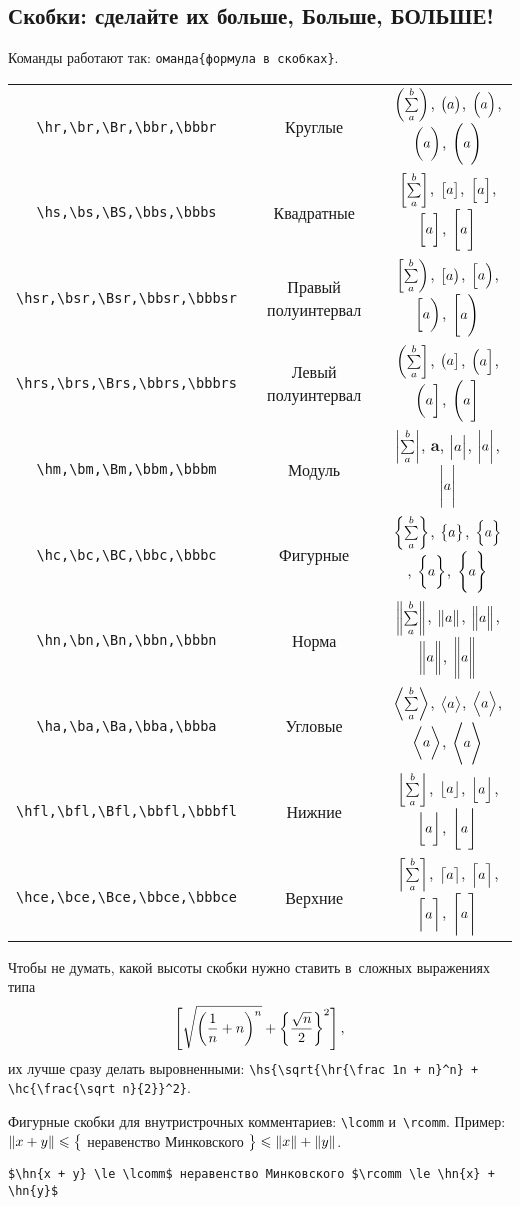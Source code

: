 \documentclass[a4paper]{article}
\begin{document}
\subsection{Скобки: сделайте их больше, Больше, БОЛЬШЕ!}
Команды работают так: \verb"оманда{формула в скобках}".
\begin{center}
\begin{tabular}{ccc}
\verb"\hr,\br,\Br,\bbr,\bbbr" & Круглые & $\left(\sum\limits_{{a}}^{{b}}\right)$, $\bigl(a\bigr)$, $\Bigl(a\Bigr)$, $\biggl(a\biggr)$, $\Biggl(a\Biggr)$ \\
\verb"\hs,\bs,\BS,\bbs,\bbbs" & Квадратные & $\left[\sum\limits_{{a}}^{{b}}\right]$, $\bigl[a\bigr]$, $\Bigl[a\Bigr]$, $\biggl[a\biggr]$, $\Biggl[a\Biggr]$ \\
\verb"\hsr,\bsr,\Bsr,\bbsr,\bbbsr" & Правый полуинтервал & $\left[\sum\limits_{{a}}^{{b}}\right)$, $\bigl[a\bigr)$, $\Bigl[a\Bigr)$, $\biggl[a\biggr)$, $\Biggl[a\Biggr)$ \\
\verb"\hrs,\brs,\Brs,\bbrs,\bbbrs" & Левый полуинтервал & $\left(\sum\limits_{{a}}^{{b}}\right]$, $\bigl(a\bigr]$, $\Bigl(a\Bigr]$, $\biggl(a\biggr]$, $\Biggl(a\Biggr]$ \\
\verb"\hm,\bm,\Bm,\bbm,\bbbm" & Модуль & $\left|\sum\limits_{{a}}^{{b}}\right|$, $\bm{a}$, $\Bigl|a\Bigr|$, $\biggl|a\biggr|$, $\Biggl|a\Biggr|$ \\
\verb"\hc,\bc,\BC,\bbc,\bbbc" & Фигурные & $\left\{\sum\limits_{{a}}^{{b}}\right\}$, $\bigl\{a\bigr\}$, $\Bigl\{a\Bigr\}$, $\biggl\{a\biggr\}$, $\Biggl\{a\Biggr\}$ \\
\verb"\hn,\bn,\Bn,\bbn,\bbbn" & Норма & $\left\|\sum\limits_{{a}}^{{b}}\right\|$, $\bigl\|a\bigr\|$, $\Bigl\|a\Bigr\|$, $\biggl\|a\biggr\|$, $\Biggl\|a\Biggr\|$ \\
\verb"\ha,\ba,\Ba,\bba,\bbba" & Угловые & $\left\langle\sum\limits_{{a}}^{{b}}\right\rangle$, $\bigl\langle a\bigr\rangle$, $\Bigl\langle a\Bigr\rangle$, $\biggl\langle a\biggr\rangle$, $\Biggl\langle a\Biggr\rangle$ \\
\verb"\hfl,\bfl,\Bfl,\bbfl,\bbbfl" & Нижние & $\left\lfloor\sum\limits_{{a}}^{{b}}\right\rfloor$, $\bigl\lfloor a\bigr\rfloor$, $\Bigl\lfloor a\Bigr\rfloor$, $\biggl\lfloor a\biggr\rfloor$, $\Biggl\lfloor a\Biggr\rfloor$ \\
\verb"\hce,\bce,\Bce,\bbce,\bbbce" & Верхние & $\left\lceil\sum\limits_{{a}}^{{b}}\right\rceil$, $\bigl\lceil a\bigr\rceil$, $\Bigl\lceil a\Bigr\rceil$, $\biggl\lceil a\biggr\rceil$, $\Biggl\lceil a\Biggr\rceil$ \\
\end{tabular}
\end{center}
\begin{ex}
Чтобы не думать, какой высоты скобки нужно ставить в~сложных выражениях типа
$$
  \left[\sqrt{\left(\frac 1n + n\right)^n} + \left\{\frac{\sqrt{n}}{2}\right\}^2\right],
$$
их лучше сразу делать выровненными: \verb'\hs{\sqrt{\hr{\frac 1n + n}^n} + \hc{\frac{\sqrt n}{2}}^2}'.
\end{ex}

Фигурные скобки для внутристрочных комментариев: \verb'\lcomm' и~\verb'\rcomm'.
Пример: $\left\|x + y\right\| \leqslant \bigl\{$ неравенство Минковского $\bigr\} \leqslant \left\|x\right\| + \left\|y\right\|$.
\begin{verbatim}
$\hn{x + y} \le \lcomm$ неравенство Минковского $\rcomm \le \hn{x} + \hn{y}$
\end{verbatim}
\end{document}
